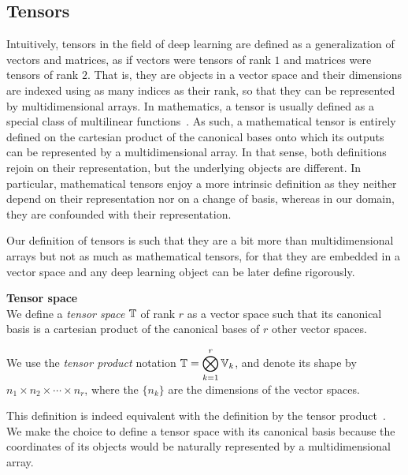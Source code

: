 \subsection{Tensors}


Intuitively, tensors in the field of deep learning are defined as a generalization of vectors and matrices, as if vectors were tensors of rank $1$ and matrices were tensors of rank $2$. That is, they are objects in a vector space and their dimensions are indexed using as many indices as their rank, so that they can be represented by multidimensional arrays. In mathematics, a tensor is usually defined as a special class of multilinear functions~\citep{bass1968cours, williamson2015tensor}. As such, a mathematical tensor is entirely defined on the cartesian product of the canonical bases onto which its outputs can be represented by a multidimensional array. In that sense, both definitions rejoin on their representation, but the underlying objects are different. In particular, mathematical tensors enjoy a more intrinsic definition as they neither depend on their representation nor on a change of basis, whereas in our domain, they are confounded with their representation.

Our definition of tensors is such that they are a bit more than multidimensional arrays but not as much as mathematical tensors, for that they are embedded in a vector space and any deep learning object can be later define rigorously.

\begin{definition}\textbf{Tensor space}\\
We define a \emph{tensor space} $\mathbb{T}$ of rank $r$ as a vector space such that its canonical basis is a cartesian product of the canonical bases of $r$ other vector spaces.

We use the \emph{tensor product} notation $\mathbb{T} = \displaystyle \bigotimes_{k=1}^r \mathbb{V}_k$, and denote its shape by $n_1 \times n_2 \times \cdots \times n_r$, where the $\{n_k\}$ are the dimensions of the vector spaces.
\end{definition}

\begin{remark}
This definition is indeed equivalent with the definition by the tensor product~\citep{hackbusch2012tensor}. We make the choice to define a tensor space with its canonical basis because the coordinates of its objects would be naturally represented by a multidimensional array.
\end{remark}

